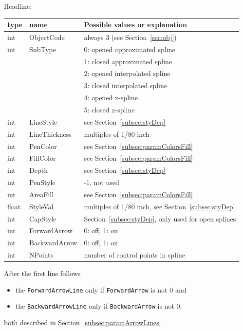 \documentclass[10pt, a4paper, english]{article}%
\begin{document}
\noindent
Headline: \\
%
\begin{tabular}{lll}
\toprule
type  & name          & Possible values or explanation \\
\midrule
\midrule
int   & ObjectCode    & always 3 (see Section~\ref{sec:obj}) \\
int   & SubType       & 0: opened approximated spline \\
&&                      1: closed approximated spline \\
&&                      2: opened interpolated spline \\
&&                      3: closed interpolated spline \\
&&                      4: opened x-spline \\
&&                      5: closed x-spline \\
int   & LineStyle     & see Section~\ref{subsec:styDep} \\
int   & LineThickness & multiples of 1/80 inch \\
int   & PenColor      & see Section~\ref{subsec:paramColorsFill} \\
int   & FillColor     & see Section~\ref{subsec:paramColorsFill} \\
int   & Depth         & see Section~\ref{subsec:styDep} \\
int   & PenStyle      & -1, not used \\
int   & AreaFill      & see Section~\ref{subsec:paramColorsFill} \\
float & StyleVal      & multiples of 1/80 inch, see Section~\ref{subsec:styDep} \\
int   & CapStyle      & Section~\ref{subsec:styDep}, only used for open splines \\
int   & ForwardArrow  & 0: off, 1: on \\
int   & BackwardArrow & 0: off, 1: on \\
int   & NPoints       & number of control points in spline \\
\bottomrule
\end{tabular}

\noindent
After the first line follows 
%
\begin{itemize}
\item
the \texttt{ForwardArrowLine}  only if \texttt{ForwardArrow}  is not 0 and 
\item
the \texttt{BackwardArrowLine} only if \texttt{BackwardArrow} is not 0; 
\end{itemize}
%
both described in Section~\ref{subsec:paramArrowLines}. 
\end{document}
